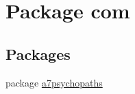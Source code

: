 \hypertarget{namespacecom}{}\section{Package com}
\label{namespacecom}
\subsection*{Packages}
\begin{DoxyCompactItemize}
\item 
package \mbox{\hyperlink{namespacecom_1_1a7psychopaths}{a7psychopaths}}
\end{DoxyCompactItemize}
